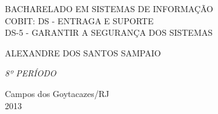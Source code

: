 \begin{titlepage}
 \begin{figure}[ht]
 \centering
 \end{figure}
 \begin{center}
   {\large BACHARELADO EM SISTEMAS DE INFORMAÇÃO} \\ [3.5cm]
   {\large COBIT: DS - ENTRAGA E SUPORTE } \\[0.6cm]
   {\large DS-5 - GARANTIR A SEGURANÇA DOS SISTEMAS }\\[9.0cm]
   \begin{flushright}
	{\large ALEXANDRE DOS SANTOS SAMPAIO} \\ [0.5cm]
	\begin{center}
		\begin{flushright}
			\textit{8º PERÍODO}
		\end{flushright}
	\end{center}
   \end{flushright}
   \vfill
   {\large Campos dos Goytacazes/RJ} \\
   {\large 2013}
 \end{center}
\end{titlepage}